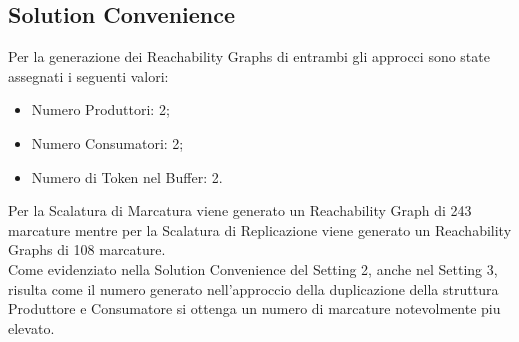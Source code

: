 \documentclass{article}
\begin{document}
\subsection{Solution Convenience}
Per la generazione dei Reachability Graphs di entrambi gli approcci sono state assegnati i seguenti valori:
\begin{itemize}
    \item Numero Produttori: 2;
    \item Numero Consumatori: 2;
    \item Numero di Token nel Buffer: 2.
\end{itemize}
Per la Scalatura di Marcatura viene generato un Reachability Graph di 243 marcature mentre per la Scalatura di Replicazione viene generato un Reachability Graphs di 108 marcature.
\\Come evidenziato nella Solution Convenience del Setting 2, anche nel Setting 3, risulta come il numero generato nell'approccio della duplicazione della struttura Produttore e Consumatore si ottenga un numero di marcature notevolmente piu elevato.
\end{document}
